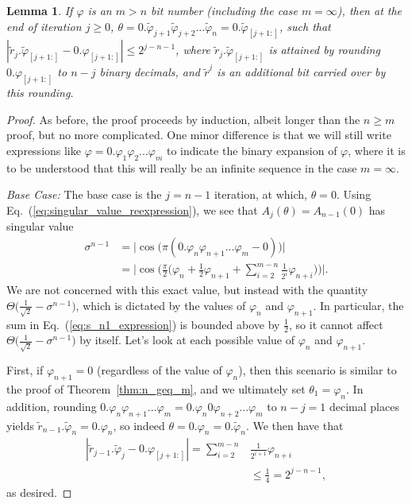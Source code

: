\documentclass[aps,pra,showpacs,notitlepage,twocolumn,superscriptaddress,nofootinbib]{revtex4-1}
\newtheorem{lemma}[theorem]{Lemma}
\begin{document}
\begin{lemma}\label{lemma:n_l_m}
If $\varphi$ is an $m>n$ bit number (including the case $m=\infty$), then at the end of iteration $j\geq 0$, $\theta = 0.\tilde{\varphi}_{j+1}\tilde{\varphi}_{j+2}...\tilde{\varphi}_{n} = 0.\tilde{\varphi}_{[j+1:]}$, such that $|\tilde{r}_j.\tilde{\varphi}_{[j+1:]} - 0.\varphi_{[j+1:]}| \leq 2^{j-n-1}$, where $\tilde{r}_j. \tilde{\varphi}_{[j+1:]}$ is attained by rounding $0.\varphi_{[j+1:]}$ to $n-j$ binary decimals, and $\tilde{r}^j$ is an additional bit carried over by this rounding. 
\end{lemma}
\begin{proof}
As before, the proof proceeds by induction, albeit longer than the $n\geq m$ proof, but no more complicated. One minor difference is that we will still write expressions like $\varphi = 0.\varphi_1 \varphi_2 ... \varphi_m$ to indicate the binary expansion of $\varphi$, where it is to be understood that this will really be an infinite sequence in the case $m=\infty$. 

\textit{Base Case:} The base case is the $j=n-1$ iteration, at which, $\theta = 0$. Using Eq.~(\ref{eq:singular_value_reexpression}), we see that $A_j(\theta) = A_{n-1}(0)$ has singular value
\begin{equation}\label{eq:s_n1_expression}
\begin{split}
    \sigma^{n-1} &= \big|\cos\big(\pi (0.\varphi_{n}\varphi_{n+1}...\varphi_{m}-0) \big) \big|\\ &=
    \Big| \cos\Big( \frac{\pi}{2}\big(\varphi_{n} + \frac{1}{2}\varphi_{n+1} + \sum_{i=2}^{m-n} \frac{1}{2^{i}} \varphi_{n+i} \big) \Big) \Big|.
\end{split}
\end{equation}
We are not concerned with this exact value, but instead with the quantity $\Theta\big(\frac{1}{\sqrt{2}} - \sigma^{n-1} \big)$, which is dictated by the values of $\varphi_n$ and $\varphi_{n+1}$. In particular, the sum in Eq.~(\ref{eq:s_n1_expression}) is bounded above by $\frac{1}{2}$, so it cannot affect $\Theta\big( \frac{1}{\sqrt{2}} - \sigma^{n-1}\big)$ by itself. Let's look at each possible value of $\varphi_n$ and $\varphi_{n+1}$. 

First, if $\varphi_{n+1} = 0$ (regardless of the value of $\varphi_n$), then this scenario is similar to the proof of Theorem~\ref{thm:n_geq_m}, and we ultimately set $\theta_1 = \varphi_{n}$. In addition, rounding $0.\varphi_{n}\varphi_{n+1}...\varphi_{m} = 0.\varphi_{n}0\varphi_{n+2}...\varphi_{m}$ to $n-j = 1$ decimal places yields $\tilde{r}_{n-1}.\tilde{\varphi}_n = 0.\varphi_{n}$, so indeed $\theta = 0.\varphi_{n} = 0.\tilde{\varphi}_n$. We then have that 
\begin{equation}
\begin{split}
    |\tilde{r}_{j-1}.\tilde{\varphi}_j - 0.\varphi_{[j+1:]}| = \sum_{i=2}^{m-n}&\frac{1}{2^{i+1}}\varphi_{n+i} \\ &\leq \frac{1}{4} = 2^{j-n-1},
\end{split}
\end{equation}
as desired.


\end{proof}
\end{document}

